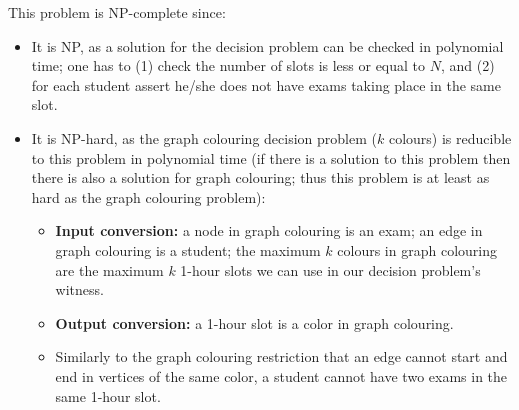 {\ansseparator

This problem is NP-complete since:
\begin{itemize}
    \item It is NP, as a solution for the decision problem can be checked in polynomial time; one has to (1) check the number of slots is less or equal to $N$, and (2) for each student assert he/she does not have exams taking place in the same slot.
    \item It is NP-hard, as the graph colouring decision problem ($k$ colours) is reducible to this problem in polynomial time (if there is a solution to this problem then there is also a solution for graph colouring; thus this problem is at least as hard as the graph colouring problem):
    \begin{itemize}
        \item \textbf{Input conversion:} a node in graph colouring is an exam; an edge in graph colouring is a student; the maximum $k$ colours in graph colouring are the maximum $k$ 1-hour slots we can use in our decision problem's witness.
        \item \textbf{Output conversion:} a 1-hour slot is a color in graph colouring.
        \item Similarly to the graph colouring restriction that an edge cannot start and end in vertices of the same color, a student cannot have two exams in the same 1-hour slot.
    \end{itemize}
\end{itemize}


}
